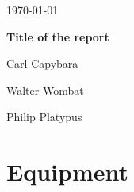 \documentclass{article}
\begin{document}
\begin{titlepage}
	\hfill \today

	\vspace{.2\textheight}

	\begin{center}
		{\LARGE\bfseries Title of the report\par}
		\vspace{3cm}
		Carl Capybara \par
		Walter Wombat \par
	\end{center}
	\vfill\centering Philip Platypus \par
\end{titlepage}
\section{Equipment}
\blindtext
\end{document}

